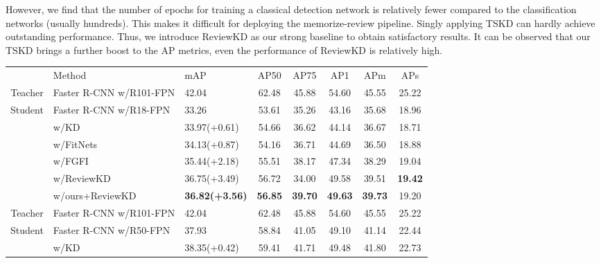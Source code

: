 \documentclass[letterpaper]{article} %
\begin{document}
However, we find that the number of epochs for training a classical detection network is relatively fewer compared to the classification networks (usually hundreds). This makes it difficult for deploying the memorize-review pipeline. Singly applying TSKD can hardly achieve outstanding performance. Thus, we introduce ReviewKD \cite{chen2021distilling} as our strong baseline to obtain satisfactory results. It can be observed that our TSKD brings a further boost to the AP metrics, even the performance of ReviewKD is relatively high.
\begin{table}[!h]
\centering
\begin{tabular}{@{}cl|lccccc@{}}
        & Method                  & mAP            & AP50           & AP75           & AP1            & APm            & APs            \\ \Xhline{1.5pt}
Teacher & Faster R-CNN w/R101-FPN & 42.04          & 62.48          & 45.88          & 54.60          & 45.55          & 25.22          \\
Student & Faster R-CNN w/R18-FPN  & 33.26          & 53.61          & 35.26          & 43.16          & 35.68          & 18.96          \\
        & w/KD                    & 33.97(+0.61)          & 54.66          & 36.62          & 44.14          & 36.67          & 18.71          \\
        & w/FitNets               & 34.13(+0.87)          & 54.16          & 36.71          & 44.69          & 36.50          & 18.88          \\
        & w/FGFI                  & 35.44(+2.18)          & 55.51          & 38.17          & 47.34          & 38.29          & 19.04          \\
        & w/ReviewKD             & 36.75(+3.49)          & 56.72          & 34.00          & 49.58          & 39.51          & \textbf{19.42} \\
        & w/ours+ReviewKD                 & \textbf{36.82(+3.56)} & \textbf{56.85} & \textbf{39.70} & \textbf{49.63} & \textbf{39.73} & 19.20          \\ \hline
Teacher & Faster R-CNN w/R101-FPN & 42.04          & 62.48          & 45.88          & 54.60          & 45.55          & 25.22          \\
Student & Faster R-CNN w/R50-FPN  & 37.93          & 58.84          & 41.05          & 49.10          & 41.14          & 22.44          \\
        & w/KD                    & 38.35(+0.42)          & 59.41          & 41.71          & 49.48          & 41.80          & 22.73          \\

\end{tabular}
\end{table}
\end{document}
